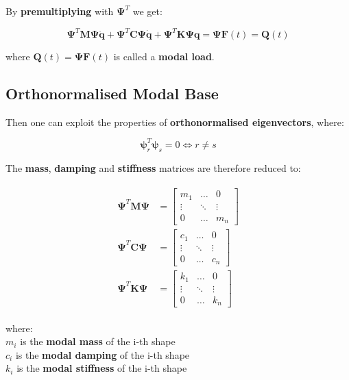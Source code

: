 \documentclass[10pt,b5paper,titlepage]{book}
\newenvironment{ematrix}
{
    \begin{eqnarray}
        \begin{aligned}
}
{
        \end{aligned}
    \end{eqnarray}
}
\begin{document}
By \textbf{premultiplying} with $ \mathbf{\Psi}^T $ we get:

\begin{equation}
    \mathbf{\Psi}^T \mathbf{M} \mathbf{\Psi} \ddot{\mathbf{q}} +
    \mathbf{\Psi}^T \mathbf{C} \mathbf{\Psi} \dot{\mathbf{q}} +
    \mathbf{\Psi}^T \mathbf{K} \mathbf{\Psi} \mathbf{q} =
    \mathbf{\Psi}\mathbf{F}(t) = \mathbf{Q}(t)
\end{equation}

where $ \mathbf{Q}(t) = \mathbf{\Psi} \mathbf{F}(t) $ is called a \textbf{modal load}.

\subsection{Orthonormalised Modal Base}

Then one can exploit the properties of \textbf{orthonormalised eigenvectors}, where:

\begin{equation}
    \mathbf{\psi}_r^T \mathbf{\psi}_s = 0 \Leftrightarrow r \neq s
\end{equation}

The \textbf{mass}, \textbf{damping} and \textbf{stiffness} matrices are therefore
reduced to:

\begin{ematrix}
    \mathbf{\Psi}^T \mathbf{M} \mathbf{\Psi}
    &= \begin{bmatrix}
        m_1 & \dots & 0 \\
        \vdots & \ddots & \vdots \\
        0 & \dots & m_n
    \end{bmatrix} \\
    \mathbf{\Psi}^T \mathbf{C} \mathbf{\Psi}
    &= \begin{bmatrix}
        c_1 & \dots & 0 \\
        \vdots & \ddots & \vdots \\
        0 & \dots & c_n
    \end{bmatrix} \\
    \mathbf{\Psi}^T \mathbf{K} \mathbf{\Psi}
    &= \begin{bmatrix}
        k_1 & \dots & 0 \\
        \vdots & \ddots & \vdots \\
        0 & \dots & k_n
    \end{bmatrix}
\end{ematrix}

where: \\
$ m_i $ is the \textbf{modal mass} of the i-th shape\\
$ c_i $ is the \textbf{modal damping} of the i-th shape\\
$ k_i $ is the \textbf{modal stiffness} of the i-th shape
\end{document}
